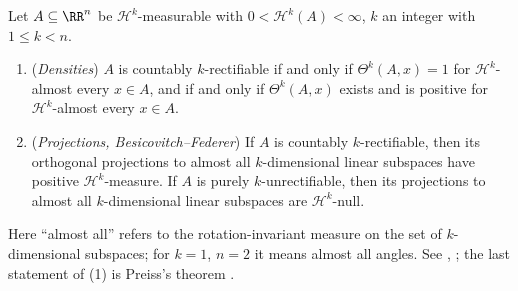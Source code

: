 \begin{theorem}\label{geometric-measure-theory:theorem-rectifiability-criteria}
Let $A \subseteq \RR^n$ be $\mathcal{H}^k$-measurable with $0 < \mathcal{H}^k(A) < \infty$, $k$ an integer with $1 \leq k < n$.
\begin{enumerate}
\item (\emph{Densities}) $A$ is countably $k$-rectifiable if and only if $\Theta^k(A, x) = 1$ for $\mathcal{H}^k$-almost every $x \in A$, and if and only if $\Theta^k(A, x)$ exists and is positive for
$\mathcal{H}^k$-almost every $x \in A$.
\item (\emph{Projections, Besicovitch--Federer}) If $A$ is countably $k$-rectifiable, then its orthogonal projections to almost all $k$-dimensional linear subspaces have positive $\mathcal{H}^k$-measure. If
$A$ is purely $k$-unrectifiable, then its projections to almost all $k$-dimensional linear subspaces are $\mathcal{H}^k$-null.
\end{enumerate}
Here ``almost all'' refers to the rotation-invariant measure on the set of $k$-dimensional subspaces; for $k = 1$, $n = 2$ it means almost all angles. See \cite{mattila-1995}, \cite{federer-gmt}; the last
statement of (1) is Preiss's theorem \cite{preiss-1987}.
\end{theorem}

